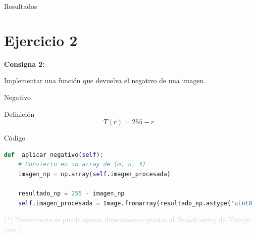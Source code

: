 \documentclass{beamer}
\begin{document}
\begin{frame}[fragile]{Resultados}
\begin{minipage}{0.45\linewidth}
		\label{fig:lenaej1}
	\end{minipage}
\end{frame}

\section{Ejercicio 2}

\begin{frame}
	\begin{center}
		\textcolor{unahurverde}{\textbf{Consigna 2:}}
	\end{center}
	\justifying
	
	Implementar una función que devuelva el negativo de una imagen.
\end{frame}

\begin{frame}[fragile]{Negativo}
	\justifying
	
	\begin{block}{Definición}
		\[
		T(r) = 255 - r
		\]
	\end{block}
\end{frame}

\begin{frame}[fragile]{Código}
	\justifying
	
	\begin{lstlisting}[language=Python]
def _aplicar_negativo(self):
	# Convierto en un array de (m, n, 3)
	imagen_np = np.array(self.imagen_procesada)
	
	resultado_np = 255 - imagen_np
	self.imagen_procesada = Image.fromarray(resultado_np.astype('uint8'))
	\end{lstlisting}
	
	\vfill
	\footnotesize \textcolor{lightgray}{(*) Nuevamente se puede operar directamente gracias al Broadcasting de Numpy (ver \cite{numpy-broadcasting}).}
\end{frame}
\end{document}
